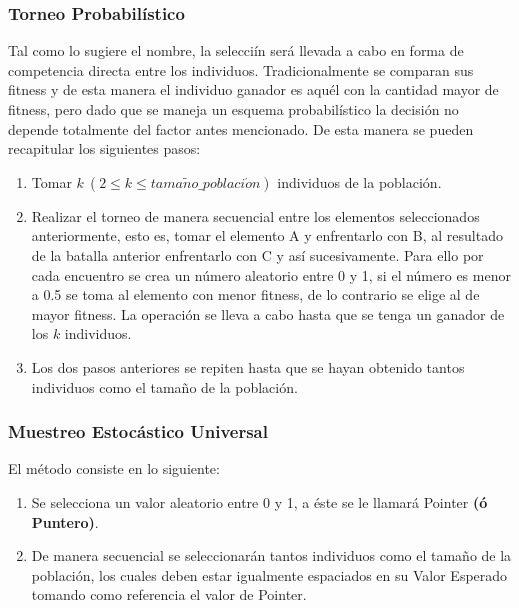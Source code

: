 \documentclass[class=report, crop=false]{standalone}
\begin{document}
\subsubsection{Torneo Probabilístico}
Tal como lo sugiere el nombre, la selecciín será llevada a 
cabo en forma de competencia directa entre los individuos.\break
Tradicionalmente se comparan sus fitness y de esta manera 
el individuo ganador es aquél con la cantidad mayor de fitness, 
pero dado que se maneja un esquema probabilístico la 
decisión no depende totalmente del factor antes mencionado.\medskip\break
De esta manera se pueden recapitular los siguientes pasos:

\begin{enumerate}
\item Tomar $k\ (2 \leqslant k \leqslant tama\tilde{n}o\_poblaci\acute{o}n)$ individuos 
de la población.
\item Realizar el torneo de manera secuencial entre los 
elementos seleccionados anteriormente, esto es, tomar el 
elemento A y enfrentarlo con B, al resultado de la batalla 
anterior enfrentarlo con C y así sucesivamente.\break
Para ello por cada encuentro se crea un número aleatorio 
entre 0 y 1, si el número es menor a 0.5 se toma al elemento 
con menor fitness, de lo contrario se elige al de mayor fitness.\break
La operación se lleva a cabo hasta que se tenga un ganador 
de los $k$ individuos.
\item Los dos pasos anteriores se repiten hasta que se hayan 
obtenido tantos individuos como el tamaño de la población.
\end{enumerate}

\subsubsection{Muestreo Estocástico Universal}
El método consiste en lo siguiente:

\begin{enumerate}
\item Se selecciona un valor aleatorio entre 0 y 1, a éste se le 
llamará Pointer \textbf{(ó Puntero)}.
\item De manera secuencial se seleccionarán tantos individuos 
como el tamaño de la población, los cuales deben estar igualmente 
espaciados en su Valor Esperado tomando como referencia el valor 
de Pointer.
\end{enumerate}
\end{document}
